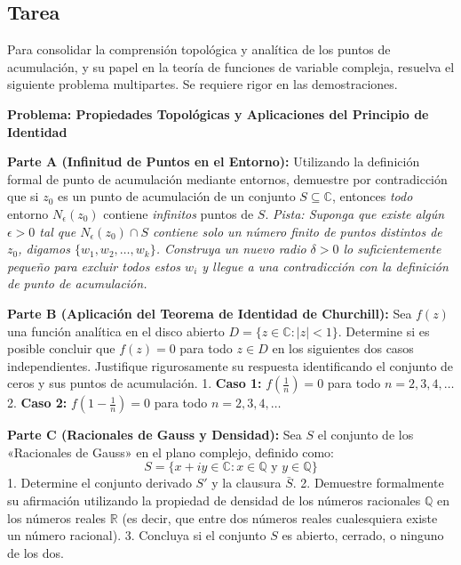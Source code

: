 \documentclass[a4paper]{article}
\begin{document}
\subsection{Tarea}

Para consolidar la comprensión topológica y analítica de los puntos de acumulación, y su papel en la teoría de funciones de variable compleja, resuelva el siguiente problema multipartes. Se requiere rigor en las demostraciones.

\textbf{Problema: Propiedades Topológicas y Aplicaciones del Principio de Identidad}

\textbf{Parte A (Infinitud de Puntos en el Entorno):}
Utilizando la definición formal de punto de acumulación mediante entornos, demuestre por contradicción que si $z_0$ es un punto de acumulación de un conjunto $S \subseteq \mathbb{C}$, entonces \textit{todo} entorno $N_\epsilon(z_0)$ contiene \textit{infinitos} puntos de $S$.
\textit{Pista: Suponga que existe algún $\epsilon > 0$ tal que $N_\epsilon(z_0) \cap S$ contiene solo un número finito de puntos distintos de $z_0$, digamos $\{w_1, w_2, \dots, w_k\}$. Construya un nuevo radio $\delta > 0$ lo suficientemente pequeño para excluir todos estos $w_i$ y llegue a una contradicción con la definición de punto de acumulación.}

\textbf{Parte B (Aplicación del Teorema de Identidad de Churchill):}
Sea $f(z)$ una función analítica en el disco abierto $D = \{ z \in \mathbb{C} : |z| < 1 \}$. Determine si es posible concluir que $f(z) = 0$ para todo $z \in D$ en los siguientes dos casos independientes. Justifique rigurosamente su respuesta identificando el conjunto de ceros y sus puntos de acumulación.
1. \textbf{Caso 1:} $f\left(\frac{1}{n}\right) = 0$ para todo $n = 2, 3, 4, \dots$
2. \textbf{Caso 2:} $f\left(1 - \frac{1}{n}\right) = 0$ para todo $n = 2, 3, 4, \dots$

\textbf{Parte C (Racionales de Gauss y Densidad):}
Sea $S$ el conjunto de los «Racionales de Gauss» en el plano complejo, definido como:
$$ S = \{ x + iy \in \mathbb{C} : x \in \mathbb{Q} \text{ y } y \in \mathbb{Q} \} $$
1. Determine el conjunto derivado $S'$ y la clausura $\bar{S}$.
2. Demuestre formalmente su afirmación utilizando la propiedad de densidad de los números racionales $\mathbb{Q}$ en los números reales $\mathbb{R}$ (es decir, que entre dos números reales cualesquiera existe un número racional).
3. Concluya si el conjunto $S$ es abierto, cerrado, o ninguno de los dos.
\end{document}
